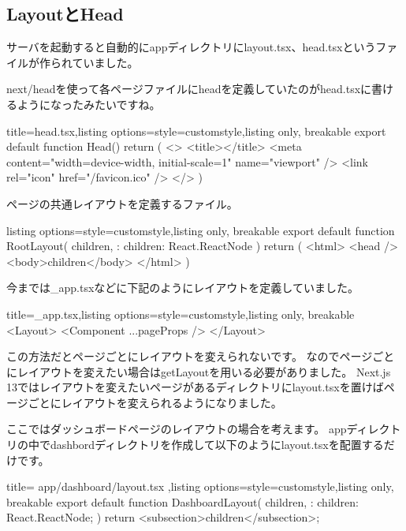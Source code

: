 \subsection{LayoutとHead}

サーバを起動すると自動的にappディレクトリにlayout.tsx、head.tsxというファイルが作られていました。

next/headを使って各ページファイルにheadを定義していたのがhead.tsxに書けるようになったみたいですね。

\begin{tcblisting}{title={head.tsx},listing options={style=customstyle},listing only, breakable}
  export default function Head() {
      return (
      <>
        <title></title>
        <meta content="width=device-width, initial-scale=1" name="viewport" />
        <link rel="icon" href="/favicon.ico" />
      </>
      )
    }
\end{tcblisting}



ページの共通レイアウトを定義するファイル。




\begin{tcblisting}{listing options={style=customstyle},listing only, breakable}
  export default function RootLayout({
      children,
    }: {
      children: React.ReactNode
  }) {
      return (
        <html>
          <head />
          <body>{children}</body>
        </html>
      )
    }

\end{tcblisting}


今までは\_app.tsxなどに下記のようにレイアウトを定義していました。
\begin{tcblisting}{title={\_app.tsx},listing options={style=customstyle},listing only, breakable}
  <Layout>
    <Component {...pageProps} />
  </Layout>
\end{tcblisting}




この方法だとページごとにレイアウトを変えられないです。
なのでページごとにレイアウトを変えたい場合はgetLayoutを用いる必要がありました。
Next.js 13ではレイアウトを変えたいページがあるディレクトリにlayout.tsxを置けばページごとにレイアウトを変えられるようになりました。


ここではダッシュボードページのレイアウトの場合を考えます。
appディレクトリの中でdashbordディレクトリを作成して以下のようにlayout.tsxを配置するだけです。



\begin{tcblisting}{title={
        app/dashboard/layout.tsx
      },listing options={style=customstyle},listing only, breakable}
  export default function DashboardLayout({
      children,
    }: {
  children: React.ReactNode;
  }) {
      return <subsection>{children}</subsection>;
    }

\end{tcblisting}




